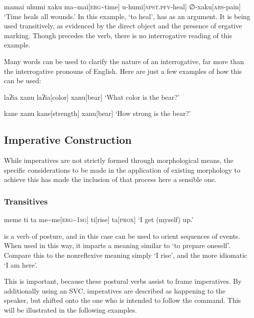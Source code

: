 \ex
\begingl
\glpreamble mamai uhumi xaku
\endpreamble
ma\textasciitilde mai[\textsc{erg\textasciitilde}time]
u-humi[\textsc{npst.pfv-}heal]
∅-xaku[\textsc{abs-}pain]
\glft `Time heals all wounds.'
\endgl
\xe
In this example,  `to heal', has  as an argument.
It is being used transitively, as evidenced by the direct object  and the presence of ergative marking.
Though  precedes the verb, there is no interrogative reading of this example.

Many words can be used to clarify the nature of an interrogative, far more than the interrogative pronouns of English.
Here are just a few examples of how this can be used:

\ex
\begingl
\glpreamble laʔia xanu
\endpreamble
laʔia[color]
xanu[bear]
\glft `What color is the bear?'
\endgl
\xe

\ex
\begingl
\glpreamble kane xanu
\endpreamble
kane[strength]
xanu[bear]
\glft `How strong is the bear?'
\endgl
\xe

\subsection{Imperative Construction}

While imperatives are not strictly formed through morphological means, the specific considerations to be made in the application of existing morphology to achieve this has made the inclusion of that process here a sensible one.

\subsubsection{Transitives}
\ex
\begingl
\glpreamble meme ti ta
\endpreamble
me\textasciitilde me[\textsc{erg\textasciitilde1sg}]
ti[rise]
ta[\textsc{prox}]
\glft `I get (myself) up.'
\endgl
\xe

 is a verb of posture, and in this case can be used to orient sequences of events.
When used in this way, it imparts a meaning similar to `to prepare oneself'.
Compare this to the nonreflexive meaning simply `I rise', and the more idiomatic `I am here'.

This is important, because these postural verbs assist to frame imperatives.
By additionally using an SVC, imperatives are described as happening to the speaker, but shifted onto the one who is intended to follow the command.
This will be illustrated in the following examples.

